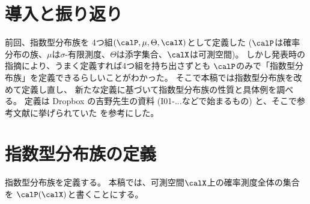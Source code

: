 \documentclass[report]{jlreq}
\begin{document}
%

%
\section{導入と振り返り}

前回、指数型分布族を
4つ組$(\calP, \mu, \Theta, \calX)$として定義した
($\calP$は確率分布の族、$\mu$は$\sigma$-有限測度、$\Theta$は添字集合、$\calX$は可測空間)。
しかし発表時の指摘により、うまく定義すれば4つ組を持ち出さずとも
$\calP$のみで「指数型分布族」を定義できるらしいことがわかった。
そこで本稿では指数型分布族を改めて定義し直し、
新たな定義に基づいて指数型分布族の性質と具体例を調べる。
定義は Dropbox の吉野先生の資料 (I01-...などで始まるもの) と、そこで参考文献に挙げられていた
\cite[Chap. 3]{wainwright_graphical_2007} を参考にした。

%
\section{指数型分布族の定義}

指数型分布族を定義する。
本稿では、可測空間$\calX$上の確率測度全体の集合を
$\calP(\calX)$と書くことにする。
\end{document}
